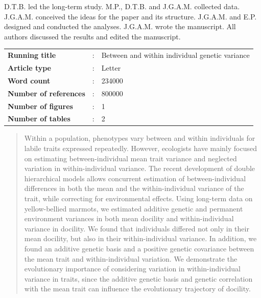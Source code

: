 \documentclass[a4paper,12pt,twoside]{article}
\begin{document}
	\begin{contribution}
		D.T.B. led the long-term study.
		M.P., D.T.B. and J.G.A.M. collected data.
		J.G.A.M. conceived the ideas for the paper and its structure.
		J.G.A.M. and E.P. designed and conducted the analyses.
		J.G.A.M. wrote the manuscript.
		All authors discussed the results and edited the manuscript. 
	\end{contribution}
	
	\vfill
	\begin{tabular}{>{\bfseries}lcl}
		Running title &:& Between and within individual genetic variance \\
		Article type &:& Letter\\ 
		Word count &:& 234000 \\
		Number of references &:& 800000 \\
		Number of figures &:& 1 \\
		Number of tables &:& 2 \\
	\end{tabular}
	\vfill
	\newpage
	
	\doublespacing
	\begin{abstract}
		
		Within a population, phenotypes vary between and within individuals for labile traits expressed repeatedly.
		However, ecologists have mainly focused on estimating between-individual mean trait variance and neglected variation in within-individual variance.
		The recent development of double hierarchical models allows concurrent estimation of between-individual differences in both the mean and the within-individual variance of the trait, while correcting for environmental effects. 
		Using long-term data on yellow-bellied marmots, we estimated additive genetic and permanent environment variances in both mean docility and within-individual variance in docility.
		We found that individuals differed not only in their mean docility, but also in their within-individual variance.
		In addition, we found an additive genetic basis and a positive genetic covariance between the mean trait and within-individual variation. 
		We demonstrate the evolutionary importance of considering variation in within-individual variance in traits, since the additive genetic basis and genetic correlation with the mean trait can influence the evolutionary trajectory of docility.
\end{abstract}
	
\end{document}
